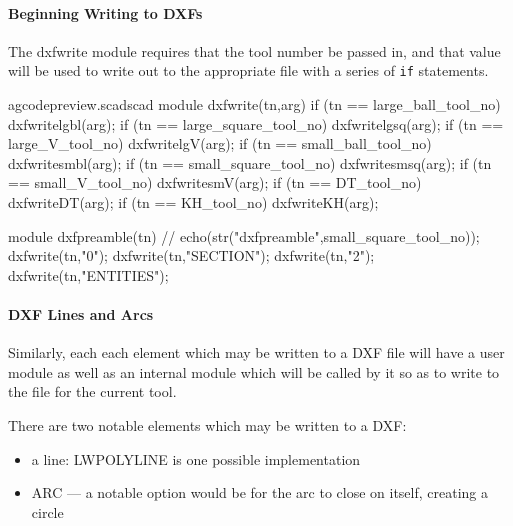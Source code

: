 \documentclass{ltxdoc}
\begin{document}
\paragraph{Beginning Writing to DXFs}%
The dxfwrite module requires that the tool number be passed in, and that value will be used
to write out to the appropriate file with a series of \texttt{if} statements.
 
\lstset{firstnumber=\thegcpscad}
\begin{writecode}{a}{gcodepreview.scad}{scad}
module dxfwrite(tn,arg) {
if (tn == large_ball_tool_no) {
    dxfwritelgbl(arg);}
if (tn == large_square_tool_no) {
    dxfwritelgsq(arg);}
if (tn == large_V_tool_no) {
    dxfwritelgV(arg);}
if (tn == small_ball_tool_no) {
    dxfwritesmbl(arg);}
if (tn == small_square_tool_no) {
    dxfwritesmsq(arg);}
if (tn == small_V_tool_no) {
    dxfwritesmV(arg);}
if (tn == DT_tool_no) {
    dxfwriteDT(arg);}
if (tn == KH_tool_no) {
    dxfwriteKH(arg);}
}

module dxfpreamble(tn) {
//    echo(str("dxfpreamble",small_square_tool_no));
    dxfwrite(tn,"0");
    dxfwrite(tn,"SECTION");
    dxfwrite(tn,"2");
    dxfwrite(tn,"ENTITIES");
}

\end{writecode}
\addtocounter{gcpscad}{27}

 
\paragraph{DXF Lines and Arcs}%
Similarly, each each element which may be written to a DXF file will have a user module
as well as an internal module which will be called by it so as to write to the file
for the current tool.
 
There are two notable elements which may be written to a DXF:

\begin{itemize}
 \item a line: LWPOLYLINE is one possible implementation
 \item ARC --- a notable option would be for the arc to close on itself, creating a circle
\end{itemize}
 
\end{document}
